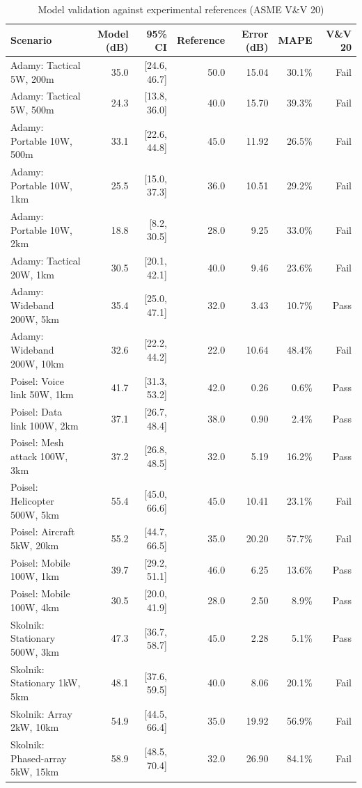 \begin{table}[htbp]
\centering
\caption{Model validation against experimental references (ASME V\&V 20)}
\label{tab:validation}
\begin{tabular}{lrrrrrr}
\toprule
Scenario & Model (dB) & 95\% CI & Reference & Error (dB) & MAPE & V\&V 20 \\
\midrule
Adamy: Tactical 5W, 200m & 35.0 & [24.6, 46.7] & 50.0 & 15.04 & 30.1\% & Fail \\
Adamy: Tactical 5W, 500m & 24.3 & [13.8, 36.0] & 40.0 & 15.70 & 39.3\% & Fail \\
Adamy: Portable 10W, 500m & 33.1 & [22.6, 44.8] & 45.0 & 11.92 & 26.5\% & Fail \\
Adamy: Portable 10W, 1km & 25.5 & [15.0, 37.3] & 36.0 & 10.51 & 29.2\% & Fail \\
Adamy: Portable 10W, 2km & 18.8 & [8.2, 30.5] & 28.0 & 9.25 & 33.0\% & Fail \\
Adamy: Tactical 20W, 1km & 30.5 & [20.1, 42.1] & 40.0 & 9.46 & 23.6\% & Fail \\
Adamy: Wideband 200W, 5km & 35.4 & [25.0, 47.1] & 32.0 & 3.43 & 10.7\% & Pass \\
Adamy: Wideband 200W, 10km & 32.6 & [22.2, 44.2] & 22.0 & 10.64 & 48.4\% & Fail \\
Poisel: Voice link 50W, 1km & 41.7 & [31.3, 53.2] & 42.0 & 0.26 & 0.6\% & Pass \\
Poisel: Data link 100W, 2km & 37.1 & [26.7, 48.4] & 38.0 & 0.90 & 2.4\% & Pass \\
Poisel: Mesh attack 100W, 3km & 37.2 & [26.8, 48.5] & 32.0 & 5.19 & 16.2\% & Pass \\
Poisel: Helicopter 500W, 5km & 55.4 & [45.0, 66.6] & 45.0 & 10.41 & 23.1\% & Fail \\
Poisel: Aircraft 5kW, 20km & 55.2 & [44.7, 66.5] & 35.0 & 20.20 & 57.7\% & Fail \\
Poisel: Mobile 100W, 1km & 39.7 & [29.2, 51.1] & 46.0 & 6.25 & 13.6\% & Pass \\
Poisel: Mobile 100W, 4km & 30.5 & [20.0, 41.9] & 28.0 & 2.50 & 8.9\% & Pass \\
Skolnik: Stationary 500W, 3km & 47.3 & [36.7, 58.7] & 45.0 & 2.28 & 5.1\% & Pass \\
Skolnik: Stationary 1kW, 5km & 48.1 & [37.6, 59.5] & 40.0 & 8.06 & 20.1\% & Fail \\
Skolnik: Array 2kW, 10km & 54.9 & [44.5, 66.4] & 35.0 & 19.92 & 56.9\% & Fail \\
Skolnik: Phased-array 5kW, 15km & 58.9 & [48.5, 70.4] & 32.0 & 26.90 & 84.1\% & Fail \\

\end{tabular}
\end{table}
